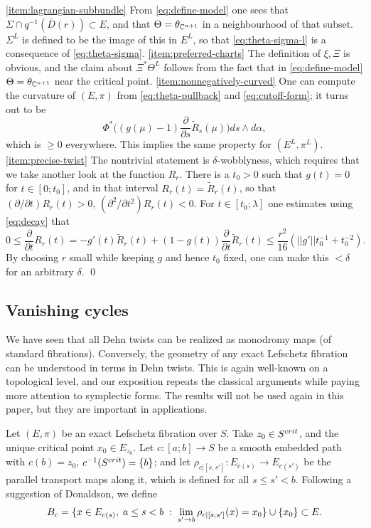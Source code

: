\documentclass[10pt,letterpaper]{article}
\begin{document}
\proof \ref{item:lagrangian-subbundle} From \eqref{eq:define-model} one sees
that $\Sigma \cap q^{-1}(\bar{D}(r)) \subset E$, and that $\Theta =
\theta_{\mathbb{C}^{n+1}}$ in a neighbourhood of that subset. $\Sigma^L$ is defined to
be the image of this in $E^L$, so that \eqref{eq:theta-sigma-l} is a
consequence of \eqref{eq:theta-sigma}. \ref{item:preferred-charts} The
definition of $\xi,\Xi$ is obvious, and the claim about $\Xi^*\Theta^L$ follows
from the fact that in \eqref{eq:define-model} $\Theta = \theta_{\mathbb{C}^{n+1}}$ near
the critical point. \ref{item:nonnegatively-curved} One can compute the
curvature of $(E,\pi)$ from \eqref{eq:theta-pullback} and
\eqref{eq:cutoff-form}; it turns out to be
\[
\Phi^*\big( (g(\mu)-1) \textstyle\frac{\partial}{\partial s} \tilde{R}_s(\mu)
\big) ds \wedge d\alpha,
\]
which is $\geq 0$ everywhere. This implies the same property for $(E^L,\pi^L)$.
\ref{item:precise-twist} The nontrivial statement is $\delta$-wobblyness, which
requires that we take another look at the function $R_r$. There is a $t_0>0$
such that $g(t) = 0$ for $t \in [0;t_0]$, and in that interval $R_r(t) =
\tilde{R}_r(t)$, so that $(\partial/\partial t) R_r(t) > 0$,
$(\partial^2/\partial t^2) R_r(t) < 0$. For $t \in [t_0;\lambda]$ one estimates
using \eqref{eq:decay} that
\[
0 \leq {\textstyle\frac{\partial}{\partial t}}R_r(t) = -g'(t) \tilde{R}_r(t) +
(1-g(t)) {\textstyle\frac{\partial}{\partial t}} \tilde{R}_r(t) \leq
\textstyle{\frac{r^2}{16}} (||g'|| t_0^{-1} + t_0^{-2}).
\]
By choosing $r$ small while keeping $g$ and hence $t_0$ fixed, one can make
this $< \delta$ for an arbitrary $\delta$. \qed

%

\subsection{Vanishing cycles\label{sec:picard-lefschetz}}

We have seen that all Dehn twists can be realized as monodromy maps (of
standard fibrations). Conversely, the geometry of any exact Lefschetz fibration
can be understood in terms in Dehn twists. This is again well-known on a
topological level, and our exposition repeats the classical arguments while
paying more attention to symplectic forms. The results will not be used again
in this paper, but they are important in applications.

Let $(E,\pi)$ be an exact Lefschetz fibration over $S$. Take $z_0 \in S^{crit}$,
and the unique critical point $x_0 \in E_{z_0}$. Let $c: [a;b] \rightarrow S$
be a smooth embedded path with $c(b) = z_0$, $c^{-1}(S^{crit}) = \{b\}$; and let
$\rho_{c|[s,s']}: E_{c(s)} \rightarrow E_{c(s')}$ be the parallel transport
maps along it, which is defined for all $s \leq s' < b$. Following a suggestion
of Donaldson, we define
\begin{equation} \label{eq:vanishing-ball}
B_c = \{x \in E_{c(s)}, \; a \leq s < b \; : \; \lim_{s' \rightarrow b}
\rho_{c|[s;s']}(x) = x_0 \} \cup \{ x_0 \} \subset E.
\end{equation}
\end{document}
